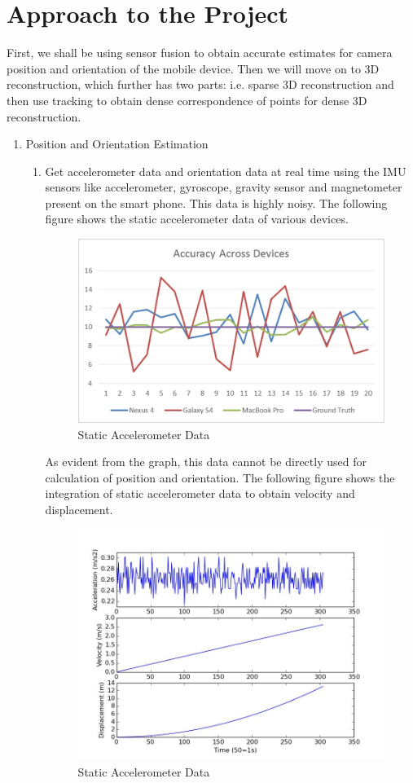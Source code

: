 \documentclass{article}
\begin{document}
	\section{Approach to the Project} 
		First, we shall be using sensor fusion to obtain accurate estimates for camera position and orientation of the mobile device. Then we will move on to 3D reconstruction, which further has two parts: i.e. sparse 3D reconstruction and then use tracking to obtain dense correspondence of points for dense 3D reconstruction.
		\begin{enumerate}
			\item Position and Orientation Estimation
			\begin{enumerate}
				\item
					Get accelerometer data and orientation data at real time using the IMU sensors like accelerometer, gyroscope, gravity sensor and magnetometer present on the smart phone.
					This data is highly noisy. The following figure shows the static accelerometer data of various devices.

					\newpage

					\begin{figure}[ht!]
					\centering
					\includegraphics[width=10cm]{graph.jpg}
					\caption{Static Accelerometer Data\label{overflow1}}
					\end{figure}

					As evident from the graph, this data cannot be directly used for calculation of position and orientation. 
					The following figure shows the integration of static accelerometer data to obtain velocity and displacement.

					\begin{figure}[ht!]
					\centering
					\includegraphics[width=10cm]{integration.jpg}
					\caption{Static Accelerometer Data\label{overflow2}}
					\end{figure}


\end{enumerate}
\end{enumerate}
\end{document}
